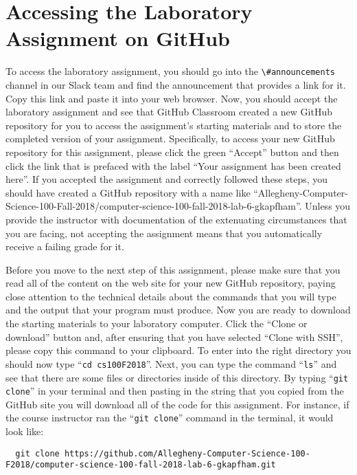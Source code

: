 \documentclass[11pt]{article}
\newcommand{\command}[1]{``\lstinline{#1}''}
\newcommand{\channel}[1]{\lstinline{#1}}
\begin{document}
\section*{Accessing the Laboratory Assignment on GitHub}

To access the laboratory assignment, you should go into the
\channel{\#announcements} channel in our Slack team and find the announcement
that provides a link for it. Copy this link and paste it into your web browser.
Now, you should accept the laboratory assignment and see that GitHub Classroom
created a new GitHub repository for you to access the assignment's starting
materials and to store the completed version of your assignment. Specifically,
to access your new GitHub repository for this assignment, please click the green
``Accept'' button and then click the link that is prefaced with the label ``Your
assignment has been created here''. If you accepted the assignment and correctly
followed these steps, you should have created a GitHub repository with a name
like
``Allegheny-Computer-Science-100-Fall-2018/computer-science-100-fall-2018-lab-6-gkapfham''.
Unless you provide the instructor with documentation of the extenuating
circumstances that you are facing, not accepting the assignment means that you
automatically receive a failing grade for it.

Before you move to the next step of this assignment, please make sure that you read all of the content on the web site
for your new GitHub repository, paying close attention to the technical details about the commands that you will type
and the output that your program must produce. Now you are ready to download the starting materials to your laboratory
computer. Click the ``Clone or download'' button and, after ensuring that you have selected ``Clone with SSH'', please
copy this command to your clipboard. To enter into the right directory you should now type \command{cd cs100F2018}.
Next, you can type the command \command{ls} and see that there are some files or directories inside of this directory.
By typing \command{git clone} in your terminal and then pasting in the string that you copied from the GitHub site you
will download all of the code for this assignment. For instance, if the course instructor ran the \command{git clone}
command in the terminal, it would look like:

\begin{lstlisting}
  git clone https://github.com/Allegheny-Computer-Science-100-F2018/computer-science-100-fall-2018-lab-6-gkapfham.git
\end{lstlisting}
\end{document}
